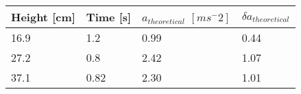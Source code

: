 \begin{tabular}{| l | l | l | l |}
\hline
    Height [cm]  & Time [s] & $a_{theoretical}$ $[ms^-2]$ & $\delta a_{theoretical}$\\ \hline
    16.9         & 1.2  & 0.99 &  0.44   \\ \hline
    27.2         & 0.8  & 2.42 &  1.07   \\ \hline
    37.1         & 0.82 & 2.30 &  1.01   \\ \hline
\end{tabular}